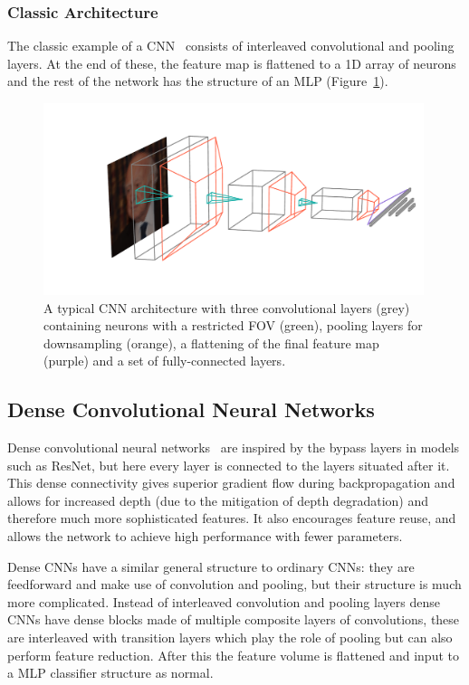 \subsubsection{Classic Architecture}
The classic example of a CNN~\cite{CS231n} consists of interleaved convolutional and pooling layers. At the end of these, the feature map is flattened to a 1D array of neurons and the rest of the network has the structure of an MLP (Figure~\ref{fig:machine_learning:classic_CNN}). 
\begin{figure}[h!]
    \centering
    \includegraphics[width=0.99\textwidth]{figures/machine_learning/convnet_arch.pdf}
    \caption{A typical CNN architecture with three convolutional layers (grey) containing neurons with a restricted FOV (green), pooling layers for downsampling (orange), a flattening of the final feature map (purple) and a set of fully-connected layers.}
        \label{fig:machine_learning:classic_CNN}
\end{figure}


\subsection{Dense Convolutional Neural Networks}
Dense convolutional neural networks~\cite{DenseNet} are inspired by the bypass layers in models such as  ResNet, but here every layer is connected to the layers situated after it. 
This dense connectivity gives superior gradient flow during backpropagation and allows for increased depth (due to the mitigation of depth degradation) and therefore much more sophisticated features. It also encourages feature reuse, and allows the network to achieve high performance with fewer parameters. 

Dense CNNs have a similar general structure to ordinary CNNs: they are feedforward and make use of convolution and pooling, but their structure is much more complicated. 
Instead of interleaved convolution and pooling layers dense CNNs have dense blocks made of multiple composite layers of convolutions, these are interleaved with transition layers which play the role of pooling but can also perform feature reduction. After this the feature volume is flattened and input to a MLP classifier structure as normal. 

